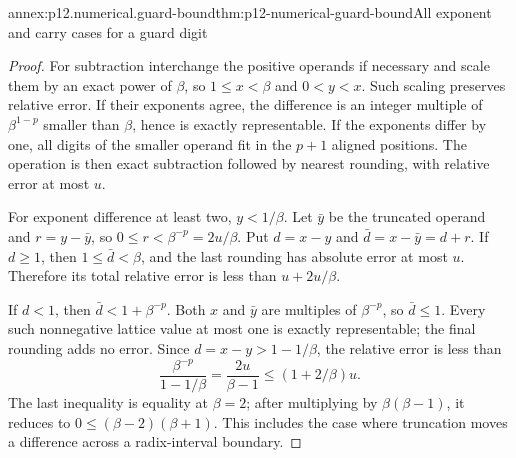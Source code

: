 \begin{annexitem}{annex:p12.numerical.guard-bound}{thm:p12-numerical-guard-bound}{All exponent and carry cases for a guard digit}
\begin{proof}
For subtraction interchange the positive operands if necessary and scale
them by an exact power of \(\beta\), so \(1\leq x<\beta\) and
\(0<y<x\). Such scaling preserves relative error. If their exponents
agree, the difference is an integer multiple of \(\beta^{1-p}\)
smaller than \(\beta\), hence is exactly representable. If the exponents
differ by one, all digits of the smaller operand fit in the \(p+1\)
aligned positions. The operation is then exact subtraction followed by
nearest rounding, with relative error at most \(u\).

For exponent difference at least two, \(y<1/\beta\). Let \(\bar y\)
be the truncated operand and \(r=y-\bar y\), so
\(0\leq r<\beta^{-p}=2u/\beta\). Put
\(d=x-y\) and \(\bar d=x-\bar y=d+r\).
If \(d\geq1\), then \(1\leq\bar d<\beta\), and the last rounding
has absolute error at most \(u\). Therefore its total relative error
is less than \(u+2u/\beta\).

If \(d<1\), then \(\bar d<1+\beta^{-p}\). Both \(x\) and
\(\bar y\) are multiples of \(\beta^{-p}\), so
\(\bar d\leq1\). Every such nonnegative lattice value at most one
is exactly representable; the final rounding adds no error. Since
\(d=x-y>1-1/\beta\), the relative error is less than
\[
 \frac{\beta^{-p}}{1-1/\beta}=\frac{2u}{\beta-1}
 \leq (1+2/\beta)u.
\]
The last inequality is equality at \(\beta=2\); after multiplying
by \(\beta(\beta-1)\), it reduces to
\(0\leq(\beta-2)(\beta+1)\). This includes the case where truncation
moves a difference across a radix-interval boundary.


\end{proof}
\end{annexitem}

